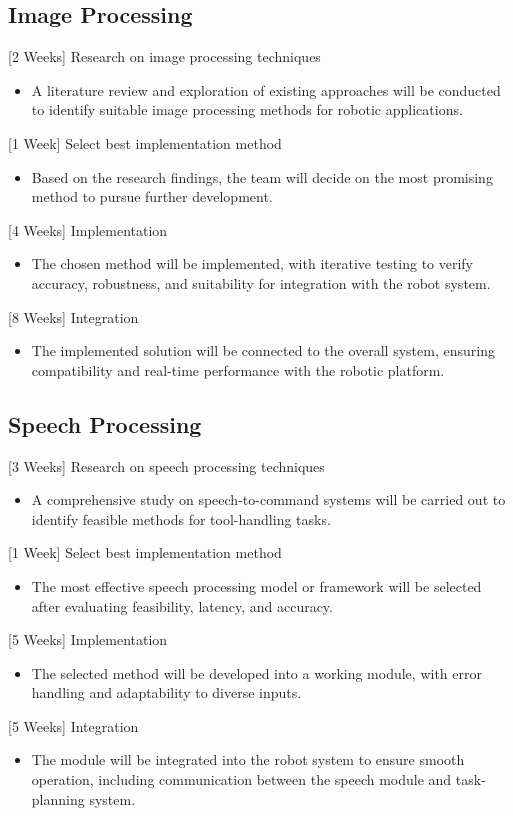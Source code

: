 \documentclass[12pt]{extarticle}
\begin{document}
\subsection{Image Processing}
[2 Weeks] Research on image processing techniques 
\begin{itemize}
    \item A literature review and exploration of existing approaches will be conducted to identify suitable image processing methods for robotic applications.
\end{itemize}
[1 Week] Select best implementation method
\begin{itemize}
    \item Based on the research findings, the team will decide on the most promising method to pursue further development.
\end{itemize}
[4 Weeks] Implementation
\begin{itemize}
    \item The chosen method will be implemented, with iterative testing to verify accuracy, robustness, and suitability for integration with the robot system.
\end{itemize}
[8 Weeks] Integration
\begin{itemize}
    \item The implemented solution will be connected to the overall system, ensuring compatibility and real-time performance with the robotic platform.
\end{itemize}
\subsection{Speech Processing}
[3 Weeks] Research on speech processing techniques
\begin{itemize}
    \item A comprehensive study on speech-to-command systems will be carried out to identify feasible methods for tool-handling tasks.
\end{itemize}
[1 Week] Select best implementation method
\begin{itemize}
    \item The most effective speech processing model or framework will be selected after evaluating feasibility, latency, and accuracy.
\end{itemize}
[5 Weeks] Implementation
\begin{itemize}
    \item The selected method will be developed into a working module, with error handling and adaptability to diverse inputs.
\end{itemize}
[5 Weeks] Integration
\begin{itemize}
    \item The module will be integrated into the robot system to ensure smooth operation, including communication between the speech module and task-planning system.
\end{itemize}
\end{document}
